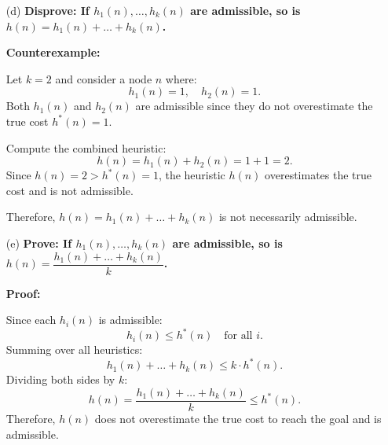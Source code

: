 \documentclass{article}
\begin{document}
\begin{enumerate}
    \item[(d)] \textbf{Disprove: If $h_1(n), \ldots, h_k(n)$ are admissible, so is $h(n) = h_1(n) + \ldots + h_k(n)$.}
    
    \textbf{Counterexample:}
    
    Let $k = 2$ and consider a node $n$ where:
    \[
    h_1(n) = 1, \quad h_2(n) = 1.
    \]
    Both $h_1(n)$ and $h_2(n)$ are admissible since they do not overestimate the true cost $h^*(n) = 1$.

    Compute the combined heuristic:
    \[
    h(n) = h_1(n) + h_2(n) = 1 + 1 = 2.
    \]
    Since $h(n) = 2 > h^*(n) = 1$, the heuristic $h(n)$ overestimates the true cost and is not admissible.

    Therefore, $h(n) = h_1(n) + \ldots + h_k(n)$ is not necessarily admissible.

    \item[(e)] \textbf{Prove: If $h_1(n), \ldots, h_k(n)$ are admissible, so is $h(n) = \dfrac{h_1(n) + \ldots + h_k(n)}{k}$.}
    
    \textbf{Proof:}
    
    Since each $h_i(n)$ is admissible:
    \[
    h_i(n) \leq h^*(n) \quad \text{for all } i.
    \]
    Summing over all heuristics:
    \[
    h_1(n) + \ldots + h_k(n) \leq k \cdot h^*(n).
    \]
    Dividing both sides by $k$:
    \[
    h(n) = \dfrac{h_1(n) + \ldots + h_k(n)}{k} \leq h^*(n).
    \]
    Therefore, $h(n)$ does not overestimate the true cost to reach the goal and is admissible.

\end{enumerate}
\end{document}

